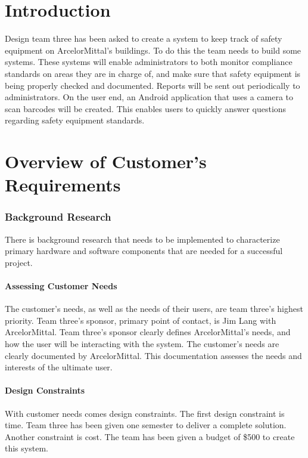 \documentclass[Letter,11pt]{article}
\begin{document}
	
			\tableofcontents
			\listoffigures
			\begingroup
			\let\clearpage\relax
			\listoftables
			\endgroup
			\newpage	


\part{Introduction}
		Design team three has been asked to create a system to keep track of safety equipment on ArcelorMittal's buildings. To do this the team needs to build some systems. These systems will enable administrators to both monitor compliance standards on areas they are in charge of, and make sure that safety equipment is being properly checked and documented. Reports will be sent out periodically to administrators. On the user end, an Android application that uses a camera to scan barcodes will be created. This enables users to quickly answer questions regarding safety equipment standards.

\part{Overview of Customer's Requirements}
\section{Background Research}\label{research}
	There is background research that needs to be implemented to characterize primary hardware and software components that are needed for a successful project.
	\subsection{Assessing Customer Needs}\label{custneeds}
	The customer's needs, as well as the needs of their users, are team three's highest priority. Team three's sponsor, primary point of contact, is Jim Lang with ArcelorMittal. Team three's sponsor clearly defines ArcelorMittal's needs, and how the user will be interacting with the system. The customer's needs are clearly documented by ArcelorMittal. This documentation assesses the needs and interests of the ultimate user.  
	\subsection{Design Constraints}
	With customer needs comes design constraints. The first design constraint is time. Team three has been given one semester to deliver a complete solution. Another constraint is cost. The team has been given a budget of \$500 to create this system.
\end{document}
